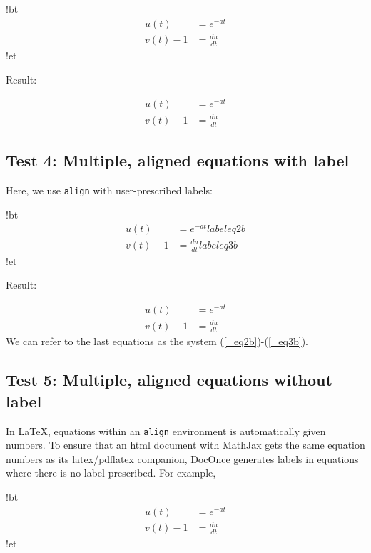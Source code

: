 \documentclass[%
oneside,                 %
final,                   %
10pt]{article}
\begin{document}
\blatexcod
!bt
\begin{align*}
u(t)&=e^{-at}\\ 
v(t) - 1 &= \frac{du}{dt}
\end{align*}
!et

\elatexcod

Result:

\begin{align*}
u(t)&=e^{-at}\\ 
v(t) - 1 &= \frac{du}{dt}
\end{align*}

\subsection{Test 4: Multiple, aligned equations with label}

Here, we use \texttt{align} with user-prescribed labels:










\blatexcod
!bt
\begin{align}
u(t)&=e^{-at}
label{eq2b}\\ 
v(t) - 1 &= \frac{du}{dt}
label{eq3b}
\end{align}
!et

\elatexcod

Result:

\begin{align}
u(t)&=e^{-at}
\label{_eq2b}\\ 
v(t) - 1 &= \frac{du}{dt}
\label{_eq3b}
\end{align}
We can refer to the last equations as the system (\ref{_eq2b})-(\ref{_eq3b}).

\subsection{Test 5: Multiple, aligned equations without label}

In {\LaTeX}, equations within an \texttt{align} environment is automatically
given numbers.  To ensure that an html document with MathJax gets the
same equation numbers as its latex/pdflatex companion, DocOnce
generates labels in equations where there is no label prescribed. For
example,









\blatexcod
!bt
\begin{align}
u(t)&=e^{-at}
\\ 
v(t) - 1 &= \frac{du}{dt}
\end{align}
!et
\end{document}
